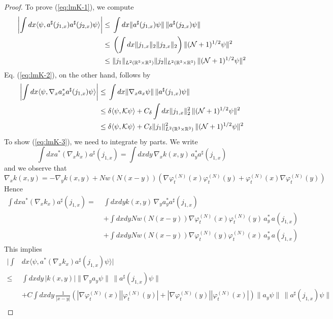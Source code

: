 \documentclass[11pt,a4paper,DIV11]{scrartcl}	%
\newcommand{\bR}{{\mathbb R}}
\newcommand{\cK}{{\cal K}}
\newcommand{\cN}{{\cal N}}
\begin{document}
\begin{proof}
To prove (\ref{eq:lmK-1}), we compute
\[ \begin{split}  \left| \int dx \langle \psi , a^\sharp (j_{1,x}) a^\sharp (j_{2,x}) \psi \rangle \right|  \leq  \; &\int dx \| a^\sharp (j_{1,x}) \psi \| \, \| a^\sharp (j_{2,x}) \psi \| \\ \leq \; &\left(\int dx \| j_{1,x} \|_2 \| j_{2,x} \|_2\right) \| (\cN+1)^{1/2} \psi \|^2 \\ \leq \; &\| j_1 \|_{L^2 (\bR^3 \times \bR^3)} \| j_2 \|_{L^2 (\bR^3 \times \bR^3)}  \, \| (\cN+1)^{1/2} \psi \|^2 \end{split} \]
Eq. (\ref{eq:lmK-2}), on the other hand, follows by
\begin{equation} \begin{split}
\left| \int dx \langle \psi, \nabla_x a_x^* a^\sharp (j_{1,x}) \psi \rangle \right| \leq \; & \int dx \| \nabla_x a_x \psi \| \, \| a^\sharp (j_{1,x}) \psi \| \\ \leq \; &\delta \langle \psi, \cK \psi \rangle + C_\delta  \int dx \| j_{1,x} \|_2^2 \, \| (\cN+1)^{1/2} \psi \|^2 \\ \leq \; & \delta \langle \psi , \cK \psi \rangle + C_\delta \| j_1 \|^2_{L^2 (\bR^3 \times \bR^3)} \, \| (\cN+1)^{1/2} \psi \|^2 \end{split} \end{equation}
To show (\ref{eq:lmK-3}), we need to integrate by parts. We write
\[ \int dx a^* (\nabla_x k_x) a^\sharp (j_{1,x})  = \int dx dy \, \nabla_x k (x,y) \, a^*_y  a^\sharp (j_{1,x}) \]
and we observe that
\[ \nabla_x k(x,y) = - \nabla_y k(x,y) + N w (N (x-y)) \left( \nabla \varphi^{(N)}_t (x) \varphi^{(N)}_t (y) + \varphi_t^{(N)} (x) \nabla \varphi_t^{(N)} (y) \right) \]
Hence
\[\begin{split} 
 \int dx a^* (\nabla_x k_x) a^\sharp (j_{1,x}) = \; & \int dx dy k (x,y) \, \nabla_y a^*_y  a^\sharp (j_{1,x}) 
\\ &+ \int dx dy N w (N (x-y)) \nabla \varphi_t^{(N)} (x) \varphi_t^{(N)} (y) \, a^*_y  \, a(j_{1,x})
\\& + \int dx dy N w (N (x-y)) \nabla \varphi_t^{(N)} (y) \varphi_t^{(N)} (x) \, a^*_y  \, a(j_{1,x})
\end{split}
 \]
This implies
\[ \begin{split}  \Big|  \int &dx \langle \psi,   a^* (\nabla_x k_x) a^\sharp (j_{1,x}) \psi \rangle \Big| \\ \leq \; & \int dx dy \, |k(x,y)| \| \nabla_y a_y \psi \| \, \| a^\sharp (j_{1,x}) \psi \| \\ &+ C \int dx dy \,  \frac{1}{|x-y|}  \left( |\nabla \varphi_t^{(N)} (x)| |\varphi^{(N)}_t (y)| +|\nabla \varphi_t^{(N)} (y)| |\varphi^{(N)}_t (x)| \right) \| a_y \psi \| \, \| a^\sharp (j_{1,x}) \psi \|  \\ 

\end{split}\]
\end{proof}
\end{document}

